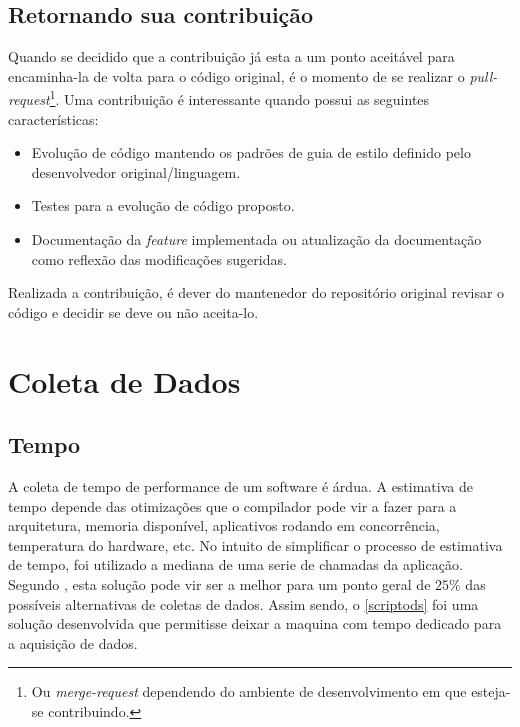 \subsection*{Retornando sua contribuição} %
\label{sub:retornando_sua_contribui_o}

Quando se decidido que a contribuição já esta a um ponto aceitável para encaminha-la de volta para o código original, é o momento de se realizar o \textit{pull-request}\footnote{Ou \textit{merge-request} dependendo do ambiente de desenvolvimento em que esteja-se contribuindo.}. Uma contribuição é interessante quando possui as seguintes características:


\begin{itemize}
	\item Evolução de código mantendo os padrões de guia de estilo definido pelo desenvolvedor original/linguagem.
	\item Testes para a evolução de código proposto.
	\item Documentação da \textit{feature} implementada ou atualização da documentação como reflexão das modificações sugeridas.
\end{itemize}

Realizada a contribuição, é dever do mantenedor do repositório original revisar o código e decidir se deve ou não aceita-lo.



\section{Coleta de Dados} %
\label{cha:coleta_de_dados}

\subsection*{Tempo} %
\label{sec:tempo}

A coleta de tempo de performance de um software é árdua. A estimativa de tempo depende das otimizações que o compilador pode vir a fazer para a arquitetura, memoria disponível, aplicativos rodando em concorrência, temperatura do hardware, etc. No intuito de simplificar o processo de estimativa de tempo, foi utilizado a mediana de uma serie de chamadas da aplicação. Segundo , esta solução pode vir ser a melhor para um ponto geral de $25\%$ das possíveis alternativas de coletas de dados. Assim sendo, o \autoref{scriptods} foi uma solução desenvolvida que permitisse deixar a maquina com tempo dedicado para a aquisição de dados.

